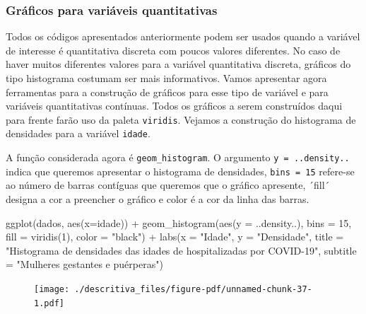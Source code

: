 \documentclass[
  letterpaper,
  DIV=11,
  numbers=noendperiod]{scrreprt}
\newenvironment{Shaded}{\begin{snugshade}}{\end{snugshade}}
\newcommand{\AttributeTok}[1]{\textcolor[rgb]{0.40,0.45,0.13}{#1}}
\newcommand{\DecValTok}[1]{\textcolor[rgb]{0.68,0.00,0.00}{#1}}
\newcommand{\FunctionTok}[1]{\textcolor[rgb]{0.28,0.35,0.67}{#1}}
\newcommand{\NormalTok}[1]{\textcolor[rgb]{0.00,0.23,0.31}{#1}}
\newcommand{\SpecialCharTok}[1]{\textcolor[rgb]{0.37,0.37,0.37}{#1}}
\newcommand{\StringTok}[1]{\textcolor[rgb]{0.13,0.47,0.30}{#1}}
\begin{document}
\hypertarget{gruxe1ficos-para-variuxe1veis-quantitativas}{%
\subsubsection{Gráficos para variáveis
quantitativas}\label{gruxe1ficos-para-variuxe1veis-quantitativas}}

Todos os códigos apresentados anteriormente podem ser usados quando a
variável de interesse é quantitativa discreta com poucos valores
diferentes. No caso de haver muitos diferentes valores para a variável
quantitativa discreta, gráficos do tipo histograma costumam ser mais
informativos. Vamos apresentar agora ferramentas para a construção de
gráficos para esse tipo de variável e para variáveis quantitativas
contínuas. Todos os gráficos a serem construídos daqui para frente farão
uso da paleta \texttt{viridis}. Vejamos a construção do histograma de
densidades para a variável \texttt{idade}.

A função considerada agora é \texttt{geom\_histogram}. O argumento
\texttt{y\ =\ ..density..} indica que queremos apresentar o histograma
de densidades, \texttt{bins\ =\ 15} refere-se ao número de barras
contíguas que queremos que o gráfico apresente, ´fill´ designa a cor a
preencher o gráfico e color é a cor da linha das barras.

\begin{Shaded}
\begin{Highlighting}[]
\FunctionTok{ggplot}\NormalTok{(dados, }\FunctionTok{aes}\NormalTok{(}\AttributeTok{x=}\NormalTok{idade))  }\SpecialCharTok{+} 
  \FunctionTok{geom\_histogram}\NormalTok{(}\FunctionTok{aes}\NormalTok{(}\AttributeTok{y =}\NormalTok{ ..density..), }\AttributeTok{bins =} \DecValTok{15}\NormalTok{, }\AttributeTok{fill =} \FunctionTok{viridis}\NormalTok{(}\DecValTok{1}\NormalTok{), }\AttributeTok{color =} \StringTok{"black"}\NormalTok{) }\SpecialCharTok{+}
  \FunctionTok{labs}\NormalTok{(}\AttributeTok{x =} \StringTok{"Idade"}\NormalTok{, }\AttributeTok{y =} \StringTok{"Densidade"}\NormalTok{, }\AttributeTok{title =} \StringTok{"Histograma de densidades das idades de hospitalizadas por COVID{-}19"}\NormalTok{, }\AttributeTok{subtitle =} \StringTok{"Mulheres gestantes e puérperas"}\NormalTok{)}
\end{Highlighting}
\end{Shaded}

\begin{figure}[H]

{\centering \texttt{[image: ./descritiva\_files/figure-pdf/unnamed-chunk-37-1.pdf]}

}

\end{figure}
\end{document}
